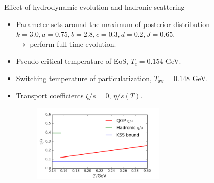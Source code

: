 \documentclass[11pt]{beamer}
\begin{document}
\begin{frame}{Effect of hydrodynamic evolution and hadronic scattering}
\begin{itemize}
\item Parameter sets around the maximum of posterior distribution \\
$k = 3.0, a = 0.75, b = 2.8, c = 0.3, d = 0.2, J = 0.65$. \\
$\rightarrow$ perform full-time evolution.

\item Pseudo-critical temperature of EoS, $T_c = 0.154$ GeV.
\item Switching temperature of particularization, $T_{\textrm{sw}} = 0.148$ GeV.
\item Transport coefficients $\zeta/s = 0$, $\eta/s(T)$.
\begin{center}
\begin{figure}
\includegraphics[width=0.6\textwidth]{./pics/trans_coeff.png}
\end{figure}
\end{center}
\end{itemize}
\end{frame}
\end{document}
